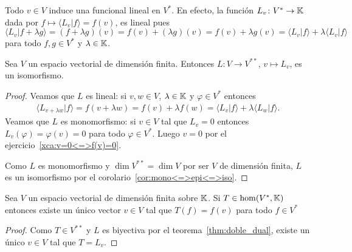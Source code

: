 \begin{block}
	Todo $v\in V$ induce una funcional lineal en $V^*$. En efecto, la función
	$L_v\colon V^*\to\mathbb{K}$ dada por $f\mapsto \langle L_v|f\rangle=f(v)$, es
	lineal pues  
	\[
	\langle L_v|f+\lambda g\rangle=(f+\lambda g)(v)=f(v)+(\lambda g)(v)=f(v)+\lambda g(v)=\langle L_v|f\rangle+\lambda\langle L_v|f\rangle
    \]
    para todo $f,g\in V^*$ y $\lambda\in\mathbb{K}$.
\end{block}

\begin{thm}
    \label{thm:doble_dual}
    Sea $V$ un espacio vectorial de dimensión finita. Entonces $L\colon V\to
    V^{**}$, $v\mapsto L_v$, es un isomorfismo.

    \begin{proof}
		Veamos que $L$ es lineal: si $v,w\in V$, $\lambda\in\mathbb{K}$ y $\varphi\in
		V^*$ entonces
        \begin{align*}
			\langle L_{v+\lambda w}|f\rangle=f(v+\lambda w)=f(v)+\lambda f(w)=\langle L_v|f\rangle+\lambda\langle L_w|f\rangle.
        \end{align*}
        Veamos que $L$ es monomorfismo: si $v\in V$ tal que $L_v=0$ entonces
		$L_v(\varphi)=\varphi(v)=0$ para todo $\varphi\in V^*$. Luego $v=0$ por
		el ejercicio~\ref{xca:v=0<=>f(v)=0}.
        
		Como $L$ es monomorfismo y $\dim V^{**}=\dim V$ por ser $V$ de
		dimensión finita, $L$ es un isomorfismo por el
		corolario~\ref{cor:mono<=>epi<=>iso}. 
    \end{proof}
\end{thm}

\begin{cor}
    \label{cor:representacion}
    Sea $V$ un espacio vectorial de dimensión finita sobre $\mathbb{K}$. Si
    $T\in\hom(V^*,\mathbb{K})$ entonces existe un único vector $v\in V$ tal que
    $T(f)=f(v)$ para todo $f\in V^*$
    
    \begin{proof}
		Como $T\in V^{**}$ y $L$ es biyectiva por el
		teorema~\ref{thm:doble_dual}, existe un único $v\in V$ tal que $T=L_v$.          
    \end{proof}
\end{cor}


